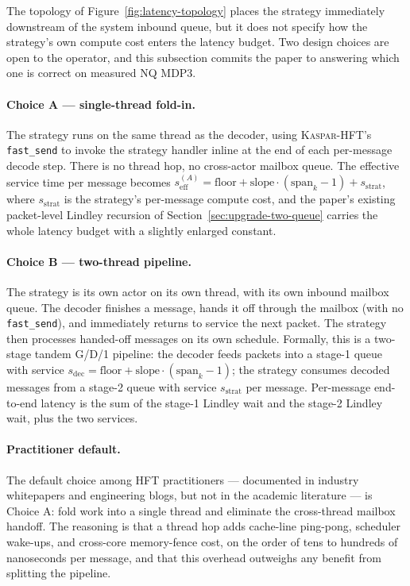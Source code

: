 \documentclass[11pt]{article}
\newcommand{\kasparhft}{\textsc{Kaspar-HFT}}
\begin{document}
The topology of Figure~\ref{fig:latency-topology} places the strategy immediately downstream of the system inbound queue, but it does not specify how the strategy's own compute cost enters the latency budget. Two design choices are open to the operator, and this subsection commits the paper to answering which one is correct on measured NQ MDP3.

\paragraph{Choice A --- single-thread fold-in.} The strategy runs on the same thread as the decoder, using \kasparhft{}'s \texttt{fast\_send} \citep{mayeski_actorhft} to invoke the strategy handler inline at the end of each per-message decode step. There is no thread hop, no cross-actor mailbox queue. The effective service time per message becomes $s_{\mathrm{eff}}^{(A)} = \text{floor} + \text{slope} \cdot (\text{span}_k - 1) + s_{\mathrm{strat}}$, where $s_{\mathrm{strat}}$ is the strategy's per-message compute cost, and the paper's existing packet-level Lindley recursion of Section~\ref{sec:upgrade-two-queue} carries the whole latency budget with a slightly enlarged constant.

\paragraph{Choice B --- two-thread pipeline.} The strategy is its own actor on its own thread, with its own inbound mailbox queue. The decoder finishes a message, hands it off through the mailbox (with no \texttt{fast\_send}), and immediately returns to service the next packet. The strategy then processes handed-off messages on its own schedule. Formally, this is a two-stage tandem G/D/1 pipeline: the decoder feeds packets into a stage-1 queue with service $s_{\mathrm{dec}} = \text{floor} + \text{slope} \cdot (\text{span}_k - 1)$; the strategy consumes decoded messages from a stage-2 queue with service $s_{\mathrm{strat}}$ per message. Per-message end-to-end latency is the sum of the stage-1 Lindley wait and the stage-2 Lindley wait, plus the two services.

\paragraph{Practitioner default.} The default choice among HFT practitioners --- documented in industry whitepapers and engineering blogs, but not in the academic literature --- is Choice A: fold work into a single thread and eliminate the cross-thread mailbox handoff. The reasoning is that a thread hop adds cache-line ping-pong, scheduler wake-ups, and cross-core memory-fence cost, on the order of tens to hundreds of nanoseconds per message, and that this overhead outweighs any benefit from splitting the pipeline.
\end{document}
